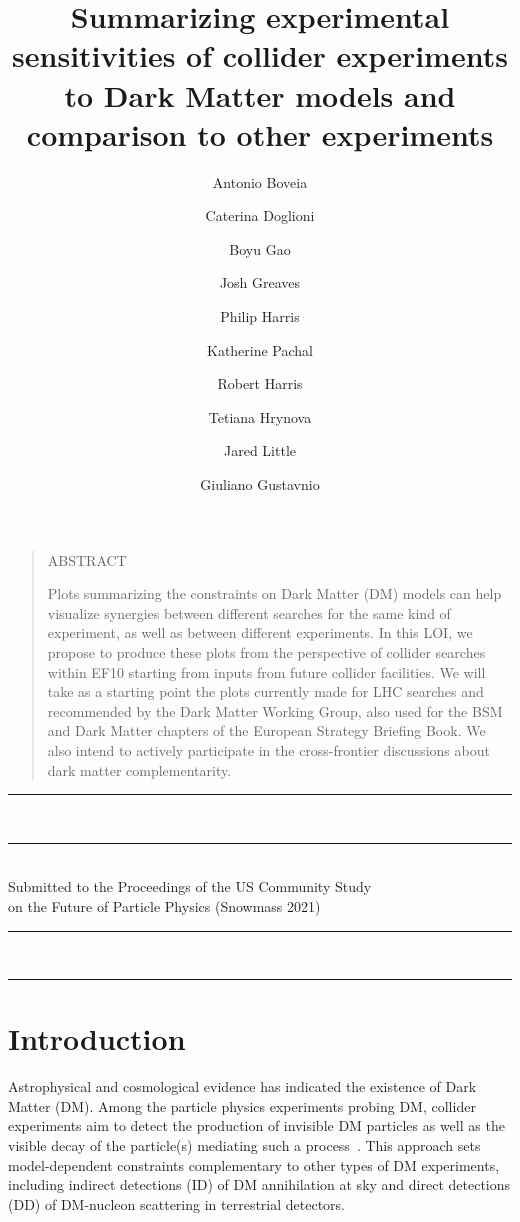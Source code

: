 \documentclass[11pt]{article}
\title{Summarizing experimental sensitivities of collider experiments to Dark Matter models and comparison to other experiments}
\author[1]{Antonio Boveia}
\affil[1]{The University of Ohio}
\author[2,3]{Caterina Doglioni}
\affil[2]{University of Manchester}
\affil[3]{Lund University}
\author[4]{Boyu Gao}
\affil[4]{Duke University}
\author[3]{Josh Greaves}
\author[5]{Philip Harris}
\affil[5]{MIT}
\author[6]{Katherine Pachal}
\affil[6]{TRIUMF}
\author[6]{Robert Harris}
\affil[6]{Fermi National Accelerator Laboratory}
\author[7]{Tetiana Hrynova}
\affil[7]{LAPP Annecy}
\author[7]{Jared Little}
\author[8]{Giuliano Gustavnio}
\affil[8]{CERN}
\newcommand\pubnumber{Preprint Number Goes Here?}
\newcommand\pubdate{\today}
\def\Title#1{\begin{center} {\LARGE #1 } \end{center}}
\def\Address#1{\begin{center}{ \it #1} \end{center}}
\newcommand\pubblock{\rightline{\begin{tabular}{l} \pubnumber\\
         \pubdate \end{tabular}}}
\newenvironment{Abstract}{\begin{quotation} \begin{center}
                       ABSTRACT
     \end{center}\bigskip  }{\end{quotation}}
\newcommand\snowmass{\begin{center}\rule[-0.2in]{\hsize}{0.01in}\\\rule{\hsize}{0.01in}\\
\vskip 0.1in Submitted to the  Proceedings of the US Community Study\\ 
on the Future of Particle Physics (Snowmass 2021)\\ 
\rule{\hsize}{0.01in}\\\rule[+0.2in]{\hsize}{0.01in} \end{center}}
\begin{document}



\maketitle




\medskip

 \begin{Abstract}
\noindent Plots summarizing the constraints on Dark Matter (DM) models can help visualize synergies between different searches for the same kind of experiment, as well as between different experiments. 
In this LOI, we propose to produce these plots from the perspective of collider searches within EF10 starting from inputs from future collider facilities. We will take as a starting point the plots currently made for LHC searches and recommended by the Dark Matter Working Group, also used for the BSM and Dark Matter chapters of the European Strategy Briefing Book. We also intend to actively participate in the cross-frontier discussions about dark matter complementarity. 
\end{Abstract}


\snowmass

\def\thefootnote{\fnsymbol{footnote}}
\setcounter{footnote}{0}
%

\section{Introduction}

Astrophysical and cosmological evidence has indicated the existence of Dark Matter (DM). Among the particle physics experiments probing DM, collider experiments aim to detect the production of invisible DM particles as well as the visible decay of the particle(s) mediating such a process~\cite{Kahlhoefer:2017dnp}. This approach sets model-dependent constraints complementary to other types of DM experiments, including indirect detections (ID) of DM annihilation at sky and direct detections (DD) of DM-nucleon scattering in terrestrial detectors.
\end{document}
